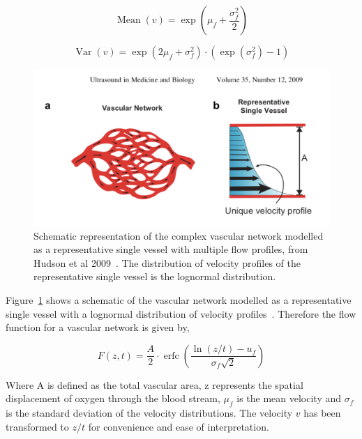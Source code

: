 \begin{equation}
\operatorname{Mean}(v)=\exp \left(\mu_{f}+\frac{\sigma_{f}^{2}}{2}\right)
\end{equation}

\begin{equation}
\operatorname{Var}(v)=\exp \left(2 \mu_{f}+\sigma_{f}^{2}\right)\cdot \left(\exp \left(\sigma_{f}^{2}\right)-1\right)
\end{equation}

\begin{figure}[htbp]
   \centering
   \includegraphics[width=\textwidth]{oemri_thesis2/oemri_thesis2-images/lognormal.png} %
   \caption{Schematic representation of the complex vascular network modelled as a representative single vessel with multiple flow profiles, from Hudson et al 2009~\cite{Hudson:2009jv}. The distribution of velocity profiles of the representative single vessel is the lognormal distribution.}
   \label{lognormal}
\end{figure}

Figure~\ref{lognormal} shows a schematic of the vascular network modelled as a representative single vessel with a lognormal distribution of velocity profiles~.
Therefore the flow function for a vascular network is given by,

\begin{equation}
F(z, t)=\frac{A}{2} \cdot \operatorname{erfc}\left(\frac{\ln (z / t)-u_{f}}{\sigma_{f} \sqrt{2}}\right)
\end{equation}

Where A is defined as the total vascular area, z represents the spatial displacement of oxygen through the blood stream, $\mu_f$ is the mean velocity and $\sigma_f$ is the standard deviation of the velocity distributions. 
The velocity $v$ has been transformed to $z/t$ for convenience and ease of interpretation.

